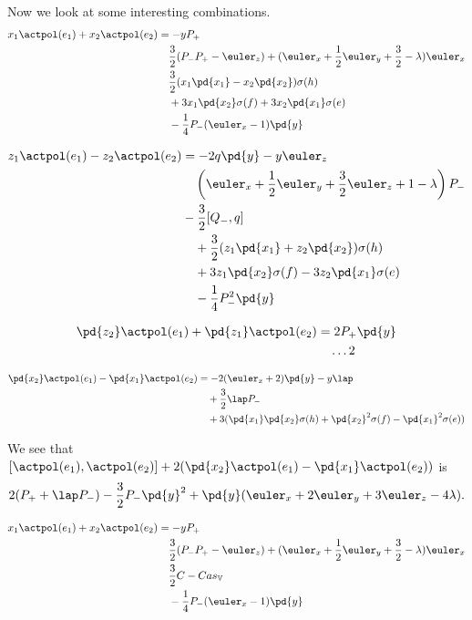Now we look at some interesting combinations.
\begin{align}
x_1 \actpol(e_1) + x_2 \actpol(e_2) &= -y P_+ \label{eq:comb1}\\
        & \quad \frac{3}{2}(P_-P_+ - \euler_z)  + (\euler_x + \frac{1}{2}\euler_y + \frac{3}{2} - \lambda)\euler_x \label{eq:comb1a}\\
        & \quad \frac{3}{2}(x_1\pd{x_1} - x_2\pd{x_2}) \sigma(h) \\
        & \quad + 3x_1\pd{x_2}\sigma(f) + 3x_2\pd{x_1}\sigma(e) \\
        & \quad - \frac{1}{4}P_- (\euler_x - 1) \pd{y}
\end{align}


\begin{align}
z_1 \actpol(e_1) - z_2 \actpol(e_2) &= -2q\pd{y} - y \euler_z \label{eq:comb2}\\
        & \quad \left( \euler_x + \frac{1}{2}\euler_y  + \frac{3}{2}\euler_z + 1 - \lambda \right) P_-\\
        & - \frac{3}{2} [Q_-, q] \\
        & \quad + \frac{3}{2}(z_1\pd{x_1} + z_2\pd{x_2})\sigma(h) \\
        & \quad + 3 z_1 \pd{x_2} \sigma(f) - 3 z_2 \pd{x_1} \sigma(e) \\
        & \quad -\frac{1}{4}P_-^2 \pd{y}
\end{align}

\begin{align}
\pd{z_2} \actpol(e_1) + \pd{z_1} \actpol(e_2) &= 2 P_+\pd{y} \\
        & \quad \dots
2\end{align}

\begin{align}
\pd{x_2} \actpol(e_1) - \pd{x_1} \actpol(e_2) &= -2 (\euler_x + 2)\pd{y} - y \lap\\
        & \quad + \frac{3}{2} \lap P_- \\
        & \quad + 3 ( \pd{x_1} \pd{x_2} \sigma(h) + \pd{x_2}^2 \sigma(f) - \pd{x_1}^2 \sigma(e))
\end{align}

We see that $[\actpol(e_1), \actpol(e_2)] + 2(\pd{x_2} \actpol(e_1) - \pd{x_1} \actpol(e_2))$ is
\begin{equation} \label{eq:vector-free}
2(P_+ + \lap P_-) - \frac{3}{2}P_- \pd{y}^2 + \pd{y}(\euler_x + 2\euler_y + 3\euler_z - 4\lambda).
\end{equation}

\begin{align}
x_1 \actpol(e_1) + x_2 \actpol(e_2) &= -y P_+ \\
        & \quad \frac{3}{2}(P_-P_+ - \euler_z)  + (\euler_x + \frac{1}{2}\euler_y + \frac{3}{2} - \lambda)\euler_x \label{eq:comb1a}\\
        & \quad \frac{3}{2} C - Cas_\mathbb{V} \\
        & \quad - \frac{1}{4}P_- (\euler_x - 1) \pd{y}
\end{align}

